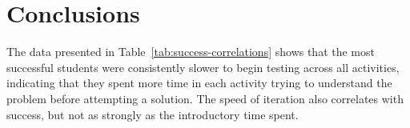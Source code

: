 %	
%	


	
\section{Conclusions }

The data presented in Table~\ref{tab:success-correlations} shows that the most successful students were consistently slower to begin testing across all activities, indicating that they spent more time in each activity trying to understand the problem before attempting a solution. The speed of iteration also correlates with success, but not as strongly as the introductory time spent.


